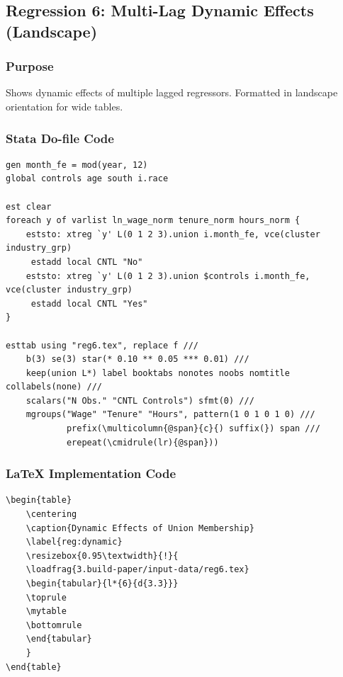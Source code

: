 \documentclass[11pt]{article}
\numberwithin{table}{section}
\newcommand{\loadfrag}[1]{%
	\begin{filecontents*}{#1}%
	\end{filecontents*}%
	\CatchFileDef{\mytable}{#1}{}%
}
\begin{document}
\clearpage
\subsection{Regression 6: Multi-Lag Dynamic Effects (Landscape)}
\subsubsection{Purpose}
Shows dynamic effects of multiple lagged regressors. Formatted in landscape orientation for wide tables.

\subsubsection{Stata Do-file Code}
\begin{lstlisting}[style=stata]
gen month_fe = mod(year, 12)
global controls age south i.race

est clear
foreach y of varlist ln_wage_norm tenure_norm hours_norm {
    eststo: xtreg `y' L(0 1 2 3).union i.month_fe, vce(cluster industry_grp)
     estadd local CNTL "No"
    eststo: xtreg `y' L(0 1 2 3).union $controls i.month_fe, vce(cluster industry_grp)
     estadd local CNTL "Yes"
}

esttab using "reg6.tex", replace f ///
    b(3) se(3) star(* 0.10 ** 0.05 *** 0.01) ///
    keep(union L*) label booktabs nonotes noobs nomtitle collabels(none) ///
    scalars("N Obs." "CNTL Controls") sfmt(0) ///
    mgroups("Wage" "Tenure" "Hours", pattern(1 0 1 0 1 0) ///
            prefix(\multicolumn{@span}{c}{) suffix(}) span ///
            erepeat(\cmidrule(lr){@span}))
\end{lstlisting}

\subsubsection{LaTeX Implementation Code}
\begin{lstlisting}[style=latex]
\begin{table}
    \centering
    \caption{Dynamic Effects of Union Membership}
    \label{reg:dynamic}
    \resizebox{0.95\textwidth}{!}{
    \loadfrag{3.build-paper/input-data/reg6.tex}
    \begin{tabular}{l*{6}{d{3.3}}}
    \toprule
    \mytable
    \bottomrule
    \end{tabular}
    }
\end{table}
\end{lstlisting}
\end{document}
